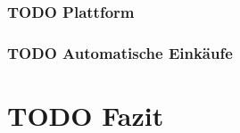 \subsubsection{\textbf{TODO} Plattform}



\subsubsection{\textbf{TODO} Automatische Einkäufe} %







\section{\textbf{TODO} Fazit}

